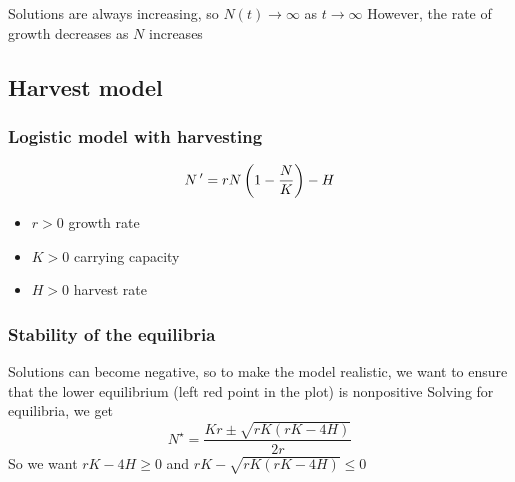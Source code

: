 \documentclass[aspectratio=169]{beamer}
\begin{document}
\begin{frame}
Solutions are always increasing, so $N(t)\to\infty$ as $t\to\infty$
\vfill
However, the rate of growth decreases as $N$ increases
\end{frame}


\subsection{Harvest model}


\begin{frame}\frametitle{Logistic model with harvesting}
\begin{equation}\label{eq:logistic-ODE-with-harvesting}
N\,' = rN\left(1-\frac{N}{K}\right)-H
\end{equation}
\vfill
\begin{itemize}
\item $r>0$ growth rate
\item $K>0$ carrying capacity
\item $H>0$ harvest rate
\end{itemize}
\end{frame}

\begin{frame}\frametitle{Stability of the equilibria}
\begin{center}
\end{center}
\end{frame}


\begin{frame}
Solutions can become negative, so to make the model realistic, we want to ensure that the lower equilibrium (left red point in the plot) is nonpositive
\vfill
Solving for equilibria, we get 
\[
N^\star = \frac{Kr\pm \sqrt{rK(rK-4H)}}{2r}
\]
\vfill
So we want $rK-4H\geq 0$ and $rK-\sqrt{rK(rK-4H)}\leq 0$
\end{frame}
\end{document}
